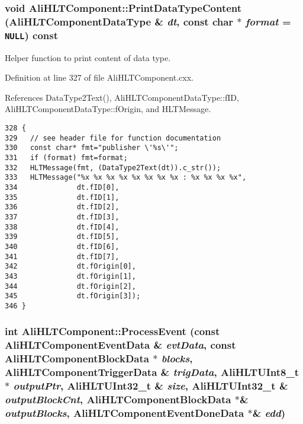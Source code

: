 \subsubsection{\setlength{\rightskip}{0pt plus 5cm}void Ali\-HLTComponent::Print\-Data\-Type\-Content ({\bf Ali\-HLTComponent\-Data\-Type} \& {\em dt}, const char $\ast$ {\em format} = {\tt NULL}) const}\label{classAliHLTComponent_a15}


Helper function to print content of data type. 

Definition at line 327 of file Ali\-HLTComponent.cxx.

References Data\-Type2Text(), Ali\-HLTComponent\-Data\-Type::f\-ID, Ali\-HLTComponent\-Data\-Type::f\-Origin, and HLTMessage.

\footnotesize\begin{verbatim}328 {
329   // see header file for function documentation
330   const char* fmt="publisher \'%s\'";
331   if (format) fmt=format;
332   HLTMessage(fmt, (DataType2Text(dt)).c_str());
333   HLTMessage("%x %x %x %x %x %x %x %x : %x %x %x %x", 
334              dt.fID[0],
335              dt.fID[1],
336              dt.fID[2],
337              dt.fID[3],
338              dt.fID[4],
339              dt.fID[5],
340              dt.fID[6],
341              dt.fID[7],
342              dt.fOrigin[0],
343              dt.fOrigin[1],
344              dt.fOrigin[2],
345              dt.fOrigin[3]);
346 }
\end{verbatim}\normalsize 


\subsubsection{\setlength{\rightskip}{0pt plus 5cm}int Ali\-HLTComponent::Process\-Event (const {\bf Ali\-HLTComponent\-Event\-Data} \& {\em evt\-Data}, const {\bf Ali\-HLTComponent\-Block\-Data} $\ast$ {\em blocks}, {\bf Ali\-HLTComponent\-Trigger\-Data} \& {\em trig\-Data}, {\bf Ali\-HLTUInt8\_\-t} $\ast$ {\em output\-Ptr}, {\bf Ali\-HLTUInt32\_\-t} \& {\em size}, {\bf Ali\-HLTUInt32\_\-t} \& {\em output\-Block\-Cnt}, {\bf Ali\-HLTComponent\-Block\-Data} $\ast$\& {\em output\-Blocks}, {\bf Ali\-HLTComponent\-Event\-Done\-Data} $\ast$\& {\em edd})}\label{classAliHLTComponent_a6}


